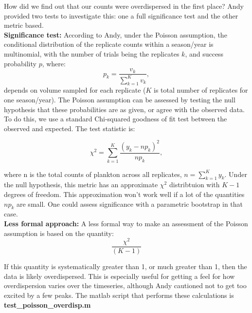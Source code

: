 \documentclass[11pt]{article}
\begin{document}
How did we find out that our counts were overdispersed in the first place? Andy provided two tests to investigate this: one a full significance test and the other metric based.\\

\noindent \textbf{Significance test:} According to Andy, under the Poisson assumption, the conditional distribution of the replicate counts within a season/year is multinomial, with the number of trials being the replicates $k$, and success probability $p$, where:
\[
p_k = \frac{v_k}{\sum_{k=1}^K v_k},
\]
depends on volume sampled for each replicate ($K$ is total number of replicates for one season/year). The Poisson assumption can be assessed by testing the null hypothesis that these probabilities are as given, or agree with the observed data. To do this, we use a standard Chi-squared goodness of fit test between the observed and expected. The test statistic is:

\[
\chi^2 = \sum_{k=1}^K \frac{(y_k-np_k)^2}{np_k},
\]

\noindent where n is the total counts of plankton across all replicates, $n= \sum_{k=1}^K y_k$. Under the null hypothesis, this metric has an approximate $\chi^2$ distribtuion with $K-1$ degrees of freedom. This approximation won't work well if a lot of the quantities $np_k$ are small. One could assess significance with a parametric bootstrap in that case.\\
                                               
\noindent \textbf{Less formal approach:} A less formal way to make an assessment of the Poisson assumption is based on the quantity:
\[
\frac{\chi^2}{(K-1)}
\]

\noindent If this quantity is systematically greater than 1, or much greater than 1, then the data is likely overdispersed. This is especially useful for getting a feel for how overdispersion varies over the timeseries, although Andy cautioned not to get too excited by a few peaks. The matlab script that performs these calculations is \textbf{test\_poisson\_overdisp.m}
\end{document}
